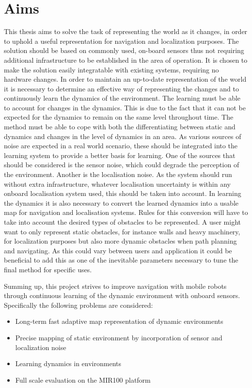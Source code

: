 \section{Aims}
This thesis aims to solve the task of representing the world as it changes, in order to uphold a useful representation for navigation and localization purposes. 
The solution should be based on commonly used, on-board sensors thus not requiring additional infrastructure to be established in the area of operation. 
It is chosen to make the solution easily integratable with existing systems, requiring no hardware changes. 
In order to maintain an up-to-date representation of the world it is necessary to determine an effective way of representing the changes and to continuously learn the dynamics of the environment. 
The learning must be able to account for changes in the dynamics. 
This is due to the fact that it can not be expected for the dynamics to remain on the same level throughout time. The method must be able to cope with both the differentiating between static and dynamics and changes in the level of dynamics in an area. 
As various sources of noise are expected in a real world scenario, these should be integrated into the learning system to provide a better basis for learning. One of the sources that should be considered is the sensor noise, which could degrade the perception of the environment. Another is the localisation noise.
As the system should run without extra infrastructure, whatever localisation uncertainty is within any onboard localisation system used, this should be taken into account.
In learning the dynamics it is also necessary to convert the learned dynamics into a usable map for navigation and localisation systems. Rules for this conversion will have to take into account the desired types of obstacles to be represented. 
A user might want to only represent static obstacles, for instance walls and heavy machinery, for localization purposes but also more dynamic obstacles when path planning and navigating. 
As this could vary between users and application it could be beneficial to add this as one of the inevitable parameters necessary to tune the final method for specific uses. 

Summing up, this project strives to improve navigation with mobile robots through continuous learning of the dynamic environment with onboard sensors. Specifically the following problems are considered:

\begin{itemize}
\item Long-term fast adaptive map representation of dynamic environments
\item Precise mapping of static environment by incorporation of sensor and localization noise
\item Learning dynamics in environments
\item Full scale evaluation on the MIR100 platform
\end{itemize}

